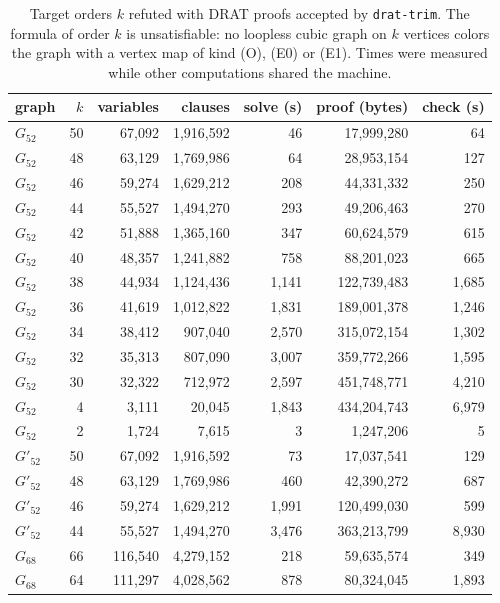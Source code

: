 \documentclass[11pt]{article}
\theoremstyle{definition}
\theoremstyle{remark}
\newcommand{\Ga}{G_{52}}
\newcommand{\Gb}{G'_{52}}
\newcommand{\Gsix}{G_{68}}
\begin{document}
\begin{table}[h]\centering\small
\begin{tabular}{lrrrrrr}
\toprule
graph & $k$ & variables & clauses & solve (s) & proof (bytes) & check (s)\\
\midrule
$\Ga$ & 50 & 67{,}092 & 1{,}916{,}592 & 46 & 17{,}999{,}280 & 64 \\
$\Ga$ & 48 & 63{,}129 & 1{,}769{,}986 & 64 & 28{,}953{,}154 & 127 \\
$\Ga$ & 46 & 59{,}274 & 1{,}629{,}212 & 208 & 44{,}331{,}332 & 250 \\
$\Ga$ & 44 & 55{,}527 & 1{,}494{,}270 & 293 & 49{,}206{,}463 & 270 \\
$\Ga$ & 42 & 51{,}888 & 1{,}365{,}160 & 347 & 60{,}624{,}579 & 615 \\
$\Ga$ & 40 & 48{,}357 & 1{,}241{,}882 & 758 & 88{,}201{,}023 & 665 \\
$\Ga$ & 38 & 44{,}934 & 1{,}124{,}436 & 1{,}141 & 122{,}739{,}483 & 1{,}685 \\
$\Ga$ & 36 & 41{,}619 & 1{,}012{,}822 & 1{,}831 & 189{,}001{,}378 & 1{,}246 \\
$\Ga$ & 34 & 38{,}412 & 907{,}040 & 2{,}570 & 315{,}072{,}154 & 1{,}302 \\
$\Ga$ & 32 & 35{,}313 & 807{,}090 & 3{,}007 & 359{,}772{,}266 & 1{,}595 \\
$\Ga$ & 30 & 32{,}322 & 712{,}972 & 2{,}597 & 451{,}748{,}771 & 4{,}210 \\
$\Ga$ & 4 & 3{,}111 & 20{,}045 & 1{,}843 & 434{,}204{,}743 & 6{,}979 \\
$\Ga$ & 2 & 1{,}724 & 7{,}615 & 3 & 1{,}247{,}206 & 5 \\
\midrule
$\Gb$ & 50 & 67{,}092 & 1{,}916{,}592 & 73 & 17{,}037{,}541 & 129 \\
$\Gb$ & 48 & 63{,}129 & 1{,}769{,}986 & 460 & 42{,}390{,}272 & 687 \\
$\Gb$ & 46 & 59{,}274 & 1{,}629{,}212 & 1{,}991 & 120{,}499{,}030 & 599 \\
$\Gb$ & 44 & 55{,}527 & 1{,}494{,}270 & 3{,}476 & 363{,}213{,}799 & 8{,}930 \\
\midrule
$\Gsix$ & 66 & 116{,}540 & 4{,}279{,}152 & 218 & 59{,}635{,}574 & 349 \\
$\Gsix$ & 64 & 111{,}297 & 4{,}028{,}562 & 878 & 80{,}324{,}045 & 1{,}893 \\
\bottomrule
\end{tabular}
\caption{Target orders $k$ refuted with DRAT proofs accepted by \texttt{drat-trim}. The formula of order $k$ is unsatisfiable: no loopless cubic graph on $k$ vertices colors the graph with a vertex map of kind (O), (E0) or (E1). Times were measured while other computations shared the machine.}\label{tab:orders}
\end{table}
\end{document}

